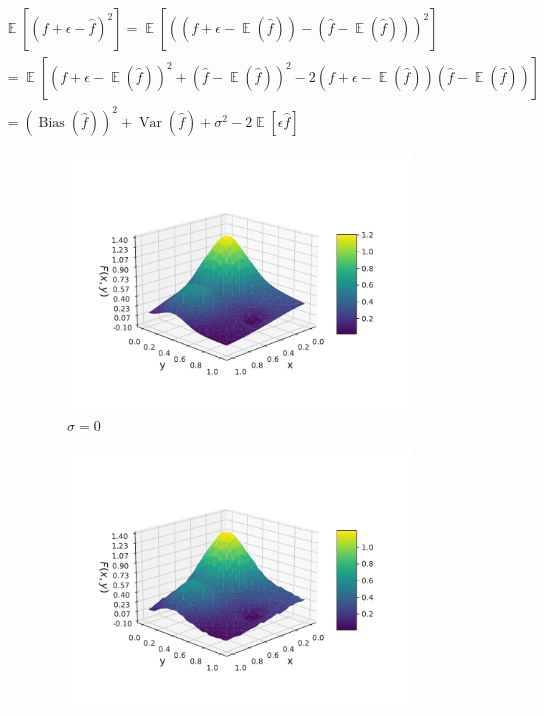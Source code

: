 \documentclass[twocolumn,english,notitlepage]{article}
\newcommand{\pclosed}[1]{\left(#1\right)}
\newcommand{\bclosed}[1]{\left[#1\right]}
\renewcommand{\expval}{\operatorname{\mathbb{E}}}
\renewcommand{\var}{\operatorname{Var}}
\newcommand{\bias}{\operatorname{Bias}}
\begin{document}
\begin{appendix}
    \begin{align} \nonumber
        &\expval\bclosed{(f+\epsilon-\hat{f})^2} = \expval\bclosed{\pclosed{(f+\epsilon-\expval(\hat{f})) - (\hat{f}-\expval(\hat{f}))}^2} \\ \nonumber
        &= \expval\bclosed{ \pclosed{f+\epsilon-\expval(\hat{f})}^2 + \pclosed{\hat{f}-\expval(\hat{f})}^2 - 2(f+\epsilon-\expval(\hat{f})) (\hat{f}-\expval(\hat{f})) } \\
        &= \pclosed{\bias(\hat{f})}^2 + \var(\hat{f}) + \sigma^2 - 2\expval\bclosed{\epsilon\hat{f}}
    \end{align}

    \begin{figure}
        \begin{subfigure}{.5\textwidth}
        \centering
        \includegraphics[width=\linewidth]{franke_functions_0.pdf}
        \caption{$\sigma = 0$}
        \end{subfigure}
        \hfill
        \begin{subfigure}{.5\textwidth}
        \centering
        \includegraphics[width=\linewidth]{franke_functions_0_01.pdf}

\end{subfigure}
\end{figure}
\end{appendix}
\end{document}
